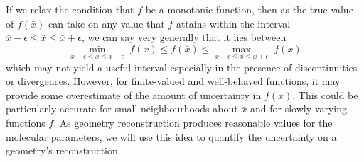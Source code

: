 If we relax the condition that $f$ be a monotonic function, then as the true value of $f(\bar{x})$ can take on any value that $f$ attains within the interval $\bar{x} - \epsilon \le \bar{x} \le \bar{x} + \epsilon$, we can say very generally that it lies between
\begin{equation}
  \min_{\displaystyle \bar{x} - \epsilon \le x \le \bar{x} + \epsilon} \; f(x)
  \le f(\bar{x})
  \le \max_{\displaystyle \bar{x} - \epsilon \le x \le \bar{x} + \epsilon} \; f(x)
\end{equation}
which may not yield a useful interval especially in the presence of discontinuities or divergences. However, for finite-valued and well-behaved functions, it may provide some overestimate of the amount of uncertainty in $f(\bar{x})$. This could be particularly accurate for small neighbourhoods about $\bar{x}$ and for slowly-varying functions $f$. As geometry reconstruction produces reasonable values for the molecular parameters, we will use this idea to quantify the uncertainty on a geometry's reconstruction.

